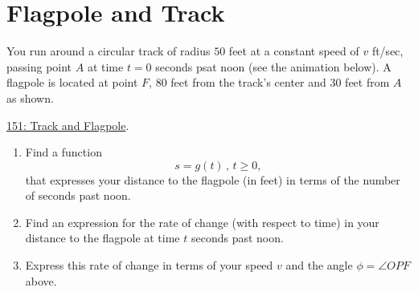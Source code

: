 \documentclass{ximera}
\begin{document}
\section{Flagpole and Track}


\begin{question} \label{QPEErmE}

You run around a circular track of radius $50$ feet at a constant speed of $v$ ft/sec, passing point $A$ at time $t=0$ seconds psat noon (see the animation below). A flagpole is located at point $F$, $80$ feet from the track's center and $30$ feet from $A$ as shown.


\href{https://www.desmos.com/calculator/yusncwhhps}{151: Track and Flagpole}.

 
\begin{onlineOnly}
    \begin{center}
\end{center}
\end{onlineOnly}

\begin{enumerate}
\item Find a function
\[
  s =g(t) \, , \, t\geq 0 ,
\]
that expresses your distance to the flagpole (in feet) in terms of the number of seconds past noon.

\item Find an expression for the rate of change (with respect to time) in your distance to the flagpole at time $t$ seconds past noon.

\item Express this rate of change in terms of your speed $v$ and the angle $\phi = \angle OPF$ above.


\end{enumerate}

\end{question}
\end{document}

